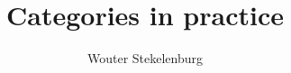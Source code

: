 \documentclass{beamer}
\title{Categories in practice}
\author{Wouter Stekelenburg}
\begin{document}
\begin{frame}
  \titlepage
\end{frame}
\end{document}
